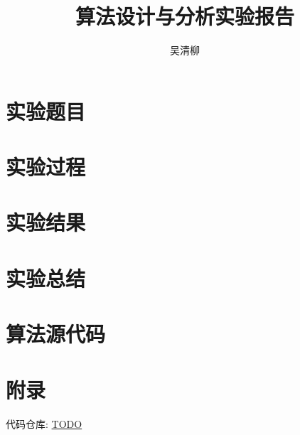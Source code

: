 \documentclass[12pt]{article}
\title{算法设计与分析实验报告}
\author{\textup{吴清柳}}
\begin{document}

\tableofcontents
\newpage

\pagestyle{fancy}
\fancyhead{} %
\fancyfoot{} %
\fancyfoot[CE, CO]{\thepage}

\section{实验题目}

\section{实验过程}

\section{实验结果}

\section{实验总结}

\section{算法源代码}

\section{附录}
代码仓库: \href{TODO}{TODO}

% 
% 
\end{document}
